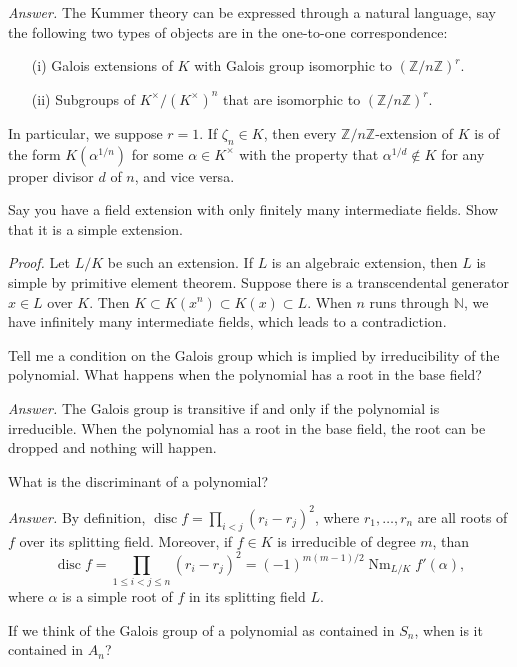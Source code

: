 \documentclass{mathproblems}
\newcommand\Z{\mathbb{Z}}
\newcommand\N{\mathbb{N}}
\DeclareMathOperator{\disc}{disc}
\begin{document}
\begin{questions}
\textit{Answer.} The Kummer theory can be expressed through a natural language, say the following two types of objects are in the one-to-one correspondence: \vspace{-4pt}
\begin{itemize}
\item[(i)] Galois extensions of $K$ with Galois group isomorphic to $(\Z/n\Z)^r$.

\item[(ii)] Subgroups of $K^\times/(K^\times)^n$ that are isomorphic to $(\Z/n\Z)^r$.
\end{itemize}\vspace{-4pt}
In particular, we suppose $r=1$. If $\zeta_n \in K$, then every $\mathbb{Z} / n \mathbb{Z}$-extension of $K$ is of the form $K(\alpha^{1 / n})$ for some $\alpha \in K^\times$ with the property that $\alpha^{1 / d} \notin K$ for any proper divisor $d$ of $n$, and vice versa. 


\miquestion
{\color{blue} Say you have a field extension with only finitely many intermediate fields. Show that it is a simple extension.}

\textit{Proof.} Let $L/K$ be such an extension. If $L$ is an algebraic extension, then $L$ is simple by primitive element theorem. Suppose there is a transcendental generator $x\in L$ over $K$. Then $K\subset K(x^n)\subset K(x)\subset L$. When $n$ runs through $\N$, we have infinitely many intermediate fields, which leads to a contradiction. 



\miquestion
{\color{blue} Tell me a condition on the Galois group which is implied by irreducibility of the polynomial. What happens when the polynomial has a root in the base field?}

\textit{Answer.}
The Galois group is transitive if and only if the polynomial is irreducible. When the polynomial has a root in the base field, the root can be dropped and nothing will happen.

\miquestion
{\color{blue} What is the discriminant of a polynomial?}

\textit{Answer.}
By definition, $\operatorname{disc} f=\prod_{i<j}(r_i-r_j)^2$, where $r_1,\ldots,r_n$ are all roots of $f$ over its splitting field. Moreover, if $f\in K$ is irreducible of degree $m$, than
$$
\disc f=\prod_{1\leqslant i<j\leqslant n}(r_i-r_j)^2=(-1)^{m(m-1)/2}\operatorname{Nm}_{L/K} f'(\alpha),
$$
where $\alpha$ is a simple root of $f$ in its splitting field $L$.

\miquestion
{\color{blue} If we think of the Galois group of a polynomial as contained in $S_{n}$, when is it contained in $A_{n}$?}


\end{questions}
\end{document}
